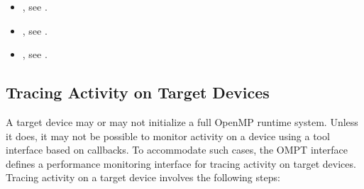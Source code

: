 \begin{itemize}
\begin{comment}
\item \code{ompt\_event\_master}, see \specref
\item \code{ompt\_event\_target\_data\_map}, see \specref
\item \code{ompt\_event\_sync\_region}, see \specref
\item \code{ompt\_event\_init\_lock}, see \specref
\item \code{ompt\_event\_destroy\_lock}, see \specref
\item \code{ompt\_event\_mutex\_acquire}, see \specref
\item \code{ompt\_event\_mutex\_acquired}, see \specref
\item \code{ompt\_event\_nested\_lock}, see ...
\end{comment}
\item {}, see .
\item {}, see .
\item {}, see .
\end{itemize}


\subsection{Tracing Activity on Target Devices}
\label{sec:tracing-device-activity}

A target device may or may not initialize a full OpenMP runtime system.
Unless it does, it may not be possible to monitor activity 
on a device using a tool interface based on callbacks.
To accommodate such cases, the OMPT interface defines 
a performance monitoring interface for tracing activity on target
devices. Tracing activity on a target device involves the following
steps:

